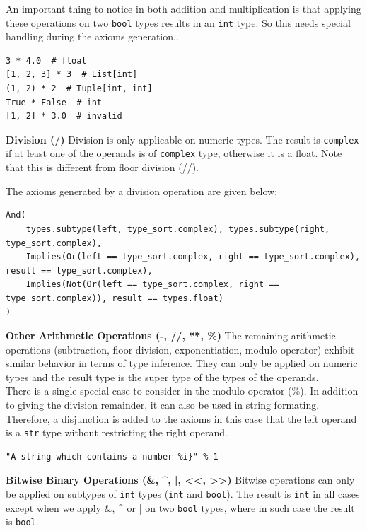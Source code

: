 An important thing to notice in both addition and multiplication is that applying these operations on two \lstinline|bool| types results in an \lstinline|int| type. So this needs special handling during the axioms generation..

\begin{lstlisting}
3 * 4.0  # float
[1, 2, 3] * 3  # List[int]
(1, 2) * 2  # Tuple[int, int]
True * False  # int
[1, 2] * 3.0  # invalid
\end{lstlisting}

\textbf{Division (/)} Division is only applicable on numeric types. The result is \lstinline|complex| if at least one of the operands is of \lstinline|complex| type, otherwise it is a float. Note that this is different from floor division (//).

The axioms generated by a division operation are given below:

\begin{lstlisting}
And(
	types.subtype(left, type_sort.complex), types.subtype(right, type_sort.complex),
	Implies(Or(left == type_sort.complex, right == type_sort.complex), result == type_sort.complex),
	Implies(Not(Or(left == type_sort.complex, right == type_sort.complex)), result == types.float)
)
\end{lstlisting}

\textbf{Other Arithmetic Operations (-, //, **, \%)}
The remaining arithmetic operations (subtraction, floor division, exponentiation, modulo operator) exhibit similar behavior in terms of type inference. They can only be applied on numeric types and the result type is the super type of the types of the operands. \\

There is a single special case to consider in the modulo operator (\%). In addition to giving the division remainder, it can also be used in string formating. Therefore, a disjunction is added to the axioms in this case that the left operand is a \lstinline|str| type without restricting the right operand.

\begin{lstlisting}
"A string which contains a number %i}" % 1
\end{lstlisting}

\textbf{Bitwise Binary Operations (\&, \textrm{\^}, |, <<, >>)}
Bitwise operations can only be applied on subtypes of \lstinline|int| types (\lstinline|int| and \lstinline|bool|). The result is \lstinline|int| in all cases except when we apply \&, \textrm{\^} or | on two \lstinline|bool| types, where in such case the result is \lstinline|bool|.

